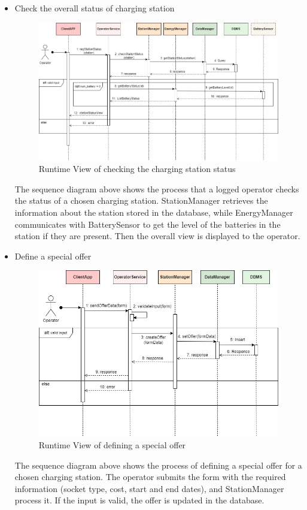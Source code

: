 \documentclass[../main.tex]{subfiles}
\begin{document}
\begin{itemize}
    \newpage
    \item Check the overall status of charging station
    {
    \vspace{2em}
    \begin{figure}[H]
    \centering
    \includegraphics[width=\textwidth]{runtimeview/op_station.png}
    \caption{Runtime View of checking the charging station status}
    \label{fig:op_station}
    \end{figure}}
    The sequence diagram above shows the process that a logged operator checks the status of a chosen charging station. StationManager retrieves the information about the station stored in the database, while EnergyManager communicates with BatterySensor to get the level of the batteries in the station if they are present. Then the overall view is displayed to the operator. 

    \newpage
    \item Define a special offer
    {
    \vspace{2em}
    \begin{figure}[H]
    \centering
    \includegraphics[width=\textwidth]{runtimeview/op_offer.png}
    \caption{Runtime View of defining a special offer}
    \label{fig:op_offer}
    \end{figure}}
    The sequence diagram above shows the process of defining a special offer for a chosen charging station. The operator submits the form with the required information (socket type, cost, start and end dates), and StationManager process it. If the input is valid, the offer is updated in the database.


\end{itemize}
\end{document}
